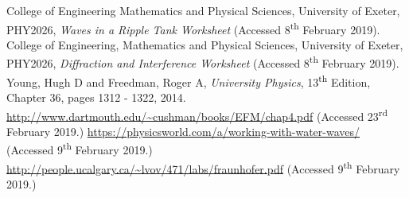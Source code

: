 \documentclass{article}
\begin{document}


\begin{thebibliography}{9}
 College of Engineering Mathematics and Physical Sciences, University of Exeter, PHY2026, \textit{Waves in a Ripple Tank Worksheet} (Accessed 8\textsuperscript{th} February 2019).
 College of Engineering, Mathematics and Physical Sciences, University of Exeter, PHY2026, \textit{Diffraction and Interference Worksheet} (Accessed 8\textsuperscript{th} February 2019).
 Young, Hugh D and Freedman, Roger A, \textit{University Physics}, 13\textsuperscript{th} Edition, Chapter 36, pages 1312 - 1322, 2014.
 \url{http://www.dartmouth.edu/~cushman/books/EFM/chap4.pdf} (Accessed 23\textsuperscript{rd} February 2019.)
 \url{https://physicsworld.com/a/working-with-water-waves/} (Accessed 9\textsuperscript{th} February 2019.)
 \url{http://people.ucalgary.ca/~lvov/471/labs/fraunhofer.pdf} (Accessed 9\textsuperscript{th} February 2019.)

\end{thebibliography}
\end{document}
